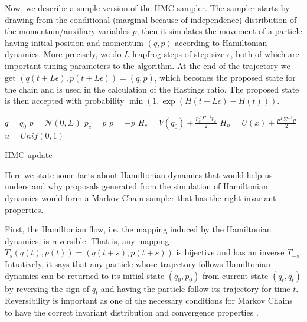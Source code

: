 \documentclass[12pt]{report}
\begin{document}
Now, we describe a simple version of the HMC sampler.
The sampler starts by drawing from the conditional (marginal because of
independence) distribution of the momentum/auxiliary variables $p$, then it simulates the
movement of a particle having initial position and momentum $(q,p)$ according to
Hamiltonian dynamics. More precisely, we do $L$ leapfrog steps of step size
$\epsilon$, both of which are important tuning parameters to the algorithm.
At the end of the trajectory we get $(q(t+L \epsilon),p(t+L \epsilon)) =
(\tilde{q}, \tilde{p})$, which becomes the proposed state for the chain and
is used in the calculation of the Hastings ratio. The proposed state is then accepted with probability $\min (1, \exp(H(t+L\epsilon)-H(t)))$. 


\begin{algorithm}
    $q = q_0$ \;
    $p = \mathcal{N}(0,\Sigma)$ \;
    $p_{c} = p$ \;
    $p = -p $ \;
    $H_{c} = V(q_0) + \frac{p_c^T\Sigma^{-1}p_c}{2}$ \;
    $H_{n} = U(x) + \frac{p^T\Sigma^{-1}p}{2}$ \;
    $u  = Unif(0,1)$ \;
\caption{HMC update}
\end{algorithm}

Here we state some facts about Hamiltonian dynamics that would help us
understand why proposals generated from the simulation of Hamiltonian dynamics would
form a Markov Chain sampler that has the right invariant properties. 

First, the Hamiltonian flow, i.e. the mapping induced by the Hamiltonian
dynamics, is reversible. That is, any mapping $T_s(q(t),p(t)) =(q(t+s),p(t+s)) $
is bijective and has an inverse $T_{-s}$. Intuitively, it says that any particle
whose trajectory follows Hamiltonian dynamics can be returned to its initial
state $(q_0,p_0)$ from current state $(q_t,q_t)$ by reversing the sign of $q_t$
and having the particle follow its trajectory for time $t$. Reversibility is
important as one of the necessary conditions for Markov Chains to have the
correct invariant distribution and
convergence properties \cite{robert2013monte}. 
\end{document}
